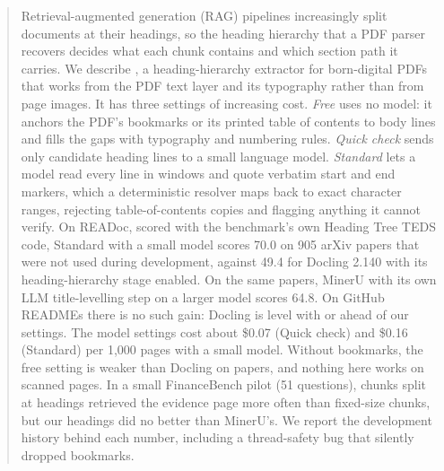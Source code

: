 \begin{abstract}
Retrieval-augmented generation (RAG) pipelines increasingly split documents at their headings, so
the heading hierarchy that a PDF parser recovers decides what each chunk contains and which section
path it carries. We describe \sysname, a heading-hierarchy extractor for born-digital PDFs that
works from the PDF text layer and its typography rather than from page images. It has three
settings of increasing cost. \emph{Free} uses no model: it anchors the PDF's bookmarks or its
printed table of contents to body lines and fills the gaps with typography and numbering rules.
\emph{Quick check} sends only candidate heading lines to a small language model. \emph{Standard}
lets a model read every line in windows and quote verbatim start and end markers, which a
deterministic resolver maps back to exact character ranges, rejecting table-of-contents copies and
flagging anything it cannot verify. On READoc, scored with the benchmark's own Heading Tree TEDS
code, Standard with a small model scores 70.0 on 905 arXiv papers that were not used during
development, against 49.4 for Docling 2.140 with its heading-hierarchy stage enabled. On the same
papers, MinerU with its own LLM title-levelling step on a larger model scores 64.8. On GitHub READMEs there is no such gain:
Docling is level with or ahead of our settings. The model settings cost about \$0.07 (Quick check)
and \$0.16 (Standard) per 1,000 pages with a small model. Without bookmarks, the free setting is
weaker than Docling on papers, and nothing here works on scanned pages. In a small FinanceBench
pilot (51 questions), chunks split at headings retrieved the evidence page more often than
fixed-size chunks, but our headings did no better than MinerU's. We report the development
history behind each number, including a thread-safety bug that silently dropped bookmarks.
\end{abstract}
